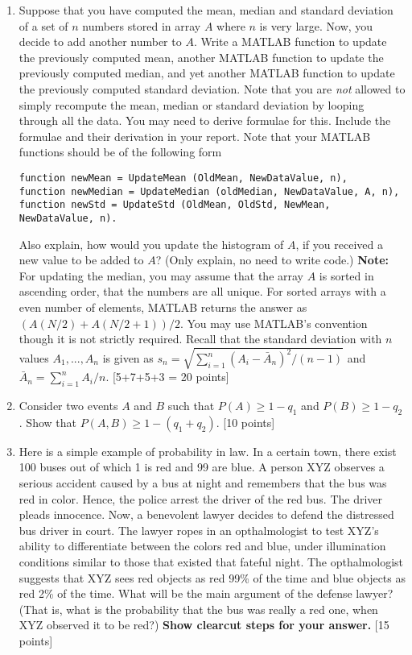 \documentclass[11pt]{article}
\begin{document}
\begin{enumerate}
\item Suppose that you have computed the mean, median and standard deviation of a set of $n$ numbers stored in array $A$ where $n$ is very large. Now, you decide to add another number to $A$. Write a MATLAB function to update the previously computed mean, another MATLAB function to update the previously computed median, and yet another MATLAB function to update the previously computed standard deviation. Note that you are \emph{not} allowed to simply recompute the mean, median or standard deviation by looping through all the data. You may need to derive formulae for this. Include the formulae and their derivation in your report. Note that your MATLAB functions should be of the following form
\begin{verbatim}
function newMean = UpdateMean (OldMean, NewDataValue, n),  
function newMedian = UpdateMedian (oldMedian, NewDataValue, A, n), 
function newStd = UpdateStd (OldMean, OldStd, NewMean, NewDataValue, n).\end{verbatim} 
Also explain, how would you update the histogram of $A$, if you received a new value to be added to $A$? (Only explain, no need to write code.)
\textbf{Note:} For updating the median, you may assume that the array $A$ is sorted in ascending order, that the numbers are all unique. For sorted arrays with a even number of elements, MATLAB returns the answer as $(A(N/2)+A(N/2+1))/2$. You may use MATLAB's convention though it is not strictly required. Recall that the standard deviation with $n$ values $A_1,...,A_n$ is given as $s_n = \sqrt{\sum_{i=1}^n (A_i-\bar{A}_n)^2/(n-1)}$ and $\bar{A}_n = \sum_{i=1}^n A_i / n $. 
\textsf{[5+7+5+3 = 20 points]}

\item Consider two events $A$ and $B$ such that $P(A) \geq 1-q_1$
and $P(B) \geq 1-q_2$. Show that $P(A,B) \geq 1-(q_1 + q_2)$. \textsf{[10 points]}

\item Here is a simple example of probability in law. In a certain town, there exist 100 buses out of which 1 is red and 99 are blue. A person XYZ observes a serious accident caused by a bus at night and remembers that the bus was red in color. Hence, the police arrest the driver of the red bus. The driver pleads innocence. Now, a benevolent lawyer decides to defend the distressed bus driver in court. The lawyer ropes in an opthalmologist to test XYZ’s ability to differentiate between the colors red and blue, under illumination conditions similar to those that existed that fateful night. The opthalmologist suggests that XYZ sees red objects as red 99\% of the time and blue
objects as red 2\% of the time. What will be the main argument of the defense lawyer? (That is,
what is the probability that the bus was really a red one, when XYZ observed it to be red?) \textbf{Show clearcut steps for your answer.} \textsf{[15 points]}



\end{enumerate}
\end{document}
